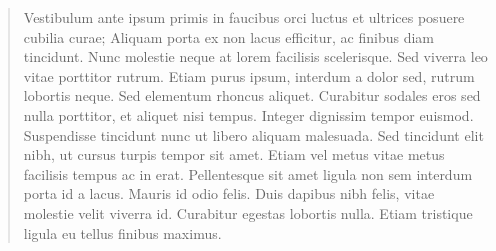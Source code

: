 \begin{abstract}

Vestibulum ante ipsum primis in faucibus orci luctus et ultrices posuere cubilia curae; Aliquam porta ex non lacus efficitur, ac finibus diam tincidunt. Nunc molestie neque at lorem facilisis scelerisque. Sed viverra leo vitae porttitor rutrum. Etiam purus ipsum, interdum a dolor sed, rutrum lobortis neque. Sed elementum rhoncus aliquet. Curabitur sodales eros sed nulla porttitor, et aliquet nisi tempus. Integer dignissim tempor euismod. Suspendisse tincidunt nunc ut libero aliquam malesuada. Sed tincidunt elit nibh, ut cursus turpis tempor sit amet. Etiam vel metus vitae metus facilisis tempus ac in erat. Pellentesque sit amet ligula non sem interdum porta id a lacus. Mauris id odio felis. Duis dapibus nibh felis, vitae molestie velit viverra id. Curabitur egestas lobortis nulla. Etiam tristique ligula eu tellus finibus maximus.

\end{abstract}
